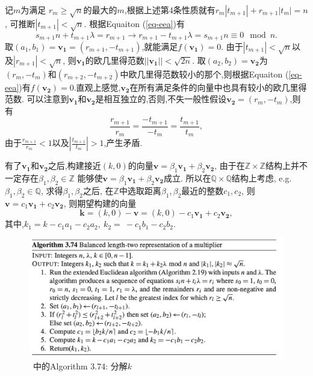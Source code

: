 \documentclass{article}
\newcommand{\Z}{\mathbb{Z}}
\newcommand{\Q}{\mathbb{Q}}
\begin{document}
记$m$为满足 $r_m \ge \sqrt{n}$的最大的$m$,根据上述第4条性质就有$r_m|t_{m+1}| + r_{m+1}|t_m| = n$, 可推断$|t_{m+1}|<\sqrt{n}$.
根据Equaiton (\ref{eq-eea})有
$$s_{m+1}n + t_{m+1}\lambda = r_{m+1} \rightarrow r_{m+1} - t_{m+1} \lambda = s_{m+1} n \equiv 0 \mod n.$$
取$(a_1, b_1) = \mathbf{v_1}  = (r_{m+1}, - t_{m+1})$,就能满足$f(\mathbf{v_1}) = 0$.
由于$|t_{m+1}|<\sqrt{n}$以及$|r_{m+1}| < \sqrt{n}$, 则$\mathbf{v_1}$的欧几里得范数$||\mathbf{v_1}|| <\sqrt{2n}$.
取$(a_2, b_2) = \mathbf{v_2}$为$(r_{m}, - t_{m})$和$(r_{m+2}, - t_{m+2})$中欧几里得范数较小的那个,则根据Equaiton (\ref{eq-eea})有$f(\mathbf{v_2}) = 0$.直观上感觉,$\mathbf{v_2}$在所有满足条件的向量中也具有较小的欧几里得范数.
可以注意到$\mathbf{v_1}$和$\mathbf{v_2}$是相互独立的,否则,不失一般性假设$\mathbf{v_2}=(r_m,-t_m)$,则有
$$
\dfrac{r_{m+1}}{r_m} = \dfrac{-t_{m+1}}{-t_m} = \dfrac{t_{m+1}}{t_m},
$$
由于$\frac{r_{m+1}}{r_m} < 1$以及$|\frac{t_{m+1}}{t_m}| > 1$,产生矛盾.

有了$\mathbf{v_1}$和$\mathbf{v_2}$之后,构建接近$(k,0)$的向量$\mathbf{v} = \beta_1\mathbf{v_1} + \beta_2\mathbf{v_2}$,
由于在$\Z\times\Z$结构上并不一定存在$\beta_1, \beta_2 \in \Z$
能够使$\mathbf{v} = \beta_1\mathbf{v_1} + \beta_2\mathbf{v_2}$成立.
所以在$\Q\times\Q$结构上考虑, e.g. $\beta_1, \beta_2 \in \Q$,
求得$\beta_1, \beta_2$之后, 在$\Z$中选取距离$\beta_1, \beta_2$最近的整数$c_1, c_2$,
则$\mathbf{v} = c_1\mathbf{v_1} + c_2\mathbf{v_2}$, 则期望构建的向量 
$$\mathbf{k} = (k,0) - \mathbf{v} = (k, 0) - c_1\mathbf{v_1} + c_2\mathbf{v_2},$$
其中,$k_1 =  k - c_1a_1 - c_2a_2, \ k_2 = \ -c_1b_1-c_2b_2$.

\begin{figure}[h]
\centering
\caption{\cite{guidetoecc}~中的Algorithm 3.74: 分解$k$}\label{fig-splitk}
\includegraphics[width=\textwidth]{split-k.png}
\end{figure}
\end{document}
